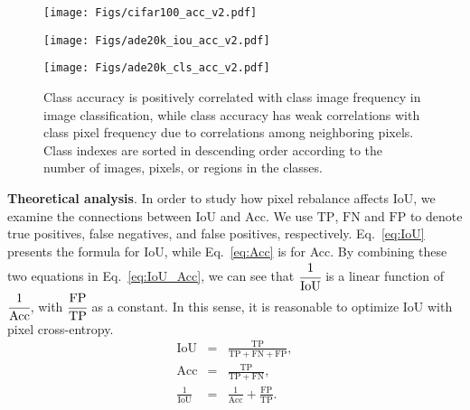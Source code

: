 \documentclass[final]{cvpr}
\begin{document}
\begin{figure*}[t]
	\begin{center}
		\begin{minipage}[t]{0.32\textwidth} 
			\begin{center}
				\texttt{[image: Figs/cifar100\_acc\_v2.pdf]} 
				\label{fig:cifar100_acc} 
			\end{center} 
		\end{minipage} 
		\hspace{0.05in}
		\begin{minipage}[t]{0.32\textwidth} 
			\begin{center}
				\texttt{[image: Figs/ade20k\_iou\_acc\_v2.pdf]} 
				\label{fig:ade20k_pixel_acc} 
			\end{center}
		\end{minipage}
		\hspace{0.05in}
		\begin{minipage}[t]{0.32\textwidth} 
			\begin{center}
				\texttt{[image: Figs/ade20k\_cls\_acc\_v2.pdf]} 
				\label{fig:ade20k_img_acc} 
			\end{center}
		\end{minipage}
	\end{center}
	\vspace{-0.20in}
	\caption{Class accuracy is positively correlated with class image frequency in image classification, while class accuracy has weak correlations with class pixel frequency due to correlations among neighboring pixels. Class indexes are sorted in descending order according to the number of images, pixels, or regions in the classes.}
	\label{fig:accs_cifar100_ade20k}
\end{figure*}

\vspace{1mm}
\noindent\textbf{Theoretical analysis}.
In order to study how pixel rebalance affects $\mathrm{IoU}$,
we examine the connections between $\mathrm{IoU}$ and $\mathrm{Acc}$. We
use $\mathrm{TP}$, $\mathrm{FN}$ and $\mathrm{FP}$ to denote true positives, false negatives, and false positives, respectively. Eq.~\eqref{eq:IoU} presents the formula for $\mathrm{IoU}$, while Eq.~\eqref{eq:Acc} is for Acc. By combining these two equations in Eq.~\eqref{eq:IoU_Acc}, we can see that $\cfrac{1}{\mathrm{IoU}}$ is a linear function of $\cfrac{1}{\mathrm{Acc}}$, with $\cfrac{\mathrm{FP}}{\mathrm{TP}}$ as a constant. In this sense, it is reasonable to optimize $\mathrm{IoU}$ with pixel cross-entropy.
\begin{eqnarray}
\mathrm{IoU} &=& \frac{\mathrm{TP}}{\mathrm{TP}+\mathrm{FN}+\mathrm{FP}}, \label{eq:IoU} \\
\mathrm{Acc} &=& \frac{\mathrm{TP}}{\mathrm{TP}+\mathrm{FN}}, \label{eq:Acc} \\
\frac{1}{\mathrm{IoU}} &=& \frac{1}{\mathrm{Acc}} + \frac{\mathrm{FP}}{\mathrm{TP}}. \label{eq:IoU_Acc}
\end{eqnarray}
\end{document}
